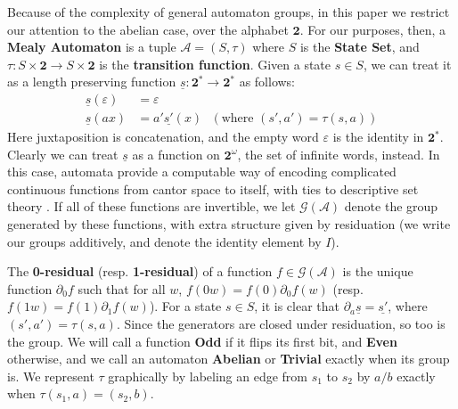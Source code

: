 \documentclass{article}
\newcommand{\A}{\mathcal{A}}
\newcommand{\G}{\mathcal{G}}
\newcommand{\2}{\textbf{2}}
\newcommand{\del}{\partial}
\theoremstyle{definition}
\begin{document}
\begin{center}
\end{center}

Because of the complexity of general automaton groups, in this paper we
restrict our attention to the abelian case, over the alphabet $\2$. 
For our purposes, then, a \textbf{Mealy Automaton} is a tuple $\A = (S, \tau)$
where $S$ is the \textbf{State Set}, and $\tau : S \times \2 \to S \times \2$ 
is the \textbf{transition function}. 
Given a state $s \in S$, we can treat it as a length preserving function 
$\underline{s} : \2^* \to \2^*$ as follows:
\begin{align*}
  \underline{s}(\varepsilon) &= \varepsilon\\
  \underline{s}(ax)       &= a' \underline{s'}(x) 
  ~~~(\text{where } (s', a') = \tau(s,a))
\end{align*}
Here juxtaposition is concatenation, and the empty word $\varepsilon$ is
the identity in $\2^*$. Clearly we can treat 
$\underline{s}$ as a function on $\2^\omega$, the set of infinite words, 
instead. In this case, automata provide a computable way of encoding 
complicated continuous functions from cantor space to itself, with ties to
descriptive set theory \cite{skrzypczak15:descriptive}.
If all of these functions are invertible, we let $\G(\A)$ denote
the group generated by these functions, with extra structure given by 
residuation (we write our groups additively, and denote the identity 
element by $I$). 

The \textbf{0-residual} (resp. \textbf{1-residual}) of a 
function $f \in \G(\A)$ is the unique function 
$\del_0 f$ such that for all $w$, $f(0w) = f(0) \del_0 f(w)$ 
(resp. $f(1w) = f(1) \del_1 f(w)$). 
For a state $s \in S$, it is clear that 
$\del_a \underline{s} = \underline{s'}$, where $(s',a') = \tau(s,a)$.
Since the generators are closed under residuation, so too is the group.
We will call a function \textbf{Odd} if it flips its first bit, and 
\textbf{Even} otherwise, and we call an automaton \textbf{Abelian} or \textbf{Trivial}
exactly when its group is. We represent $\tau$ graphically by labeling an
edge from $s_1$ to $s_2$ by $a/b$ exactly when $\tau(s_1,a) = (s_2,b)$.
\end{document}
